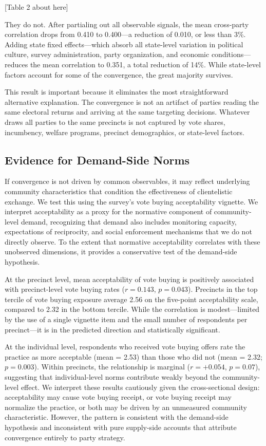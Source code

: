\documentclass[12pt,letterpaper]{article}
\begin{document}
[Table 2 about here]

They do not. After partialing out all observable signals, the mean cross-party correlation drops from 0.410 to 0.400---a reduction of 0.010, or less than 3\%. Adding state fixed effects---which absorb all state-level variation in political culture, survey administration, party organization, and economic conditions---reduces the mean correlation to 0.351, a total reduction of 14\%. While state-level factors account for some of the convergence, the great majority survives.

This result is important because it eliminates the most straightforward alternative explanation. The convergence is not an artifact of parties reading the same electoral returns and arriving at the same targeting decisions. Whatever draws all parties to the same precincts is not captured by vote shares, incumbency, welfare programs, precinct demographics, or state-level factors.


\subsection{Evidence for Demand-Side Norms}

If convergence is not driven by common observables, it may reflect underlying community characteristics that condition the effectiveness of clientelistic exchange. We test this using the survey's vote buying acceptability vignette. We interpret acceptability as a proxy for the normative component of community-level demand, recognizing that demand also includes monitoring capacity, expectations of reciprocity, and social enforcement mechanisms that we do not directly observe. To the extent that normative acceptability correlates with these unobserved dimensions, it provides a conservative test of the demand-side hypothesis.

At the precinct level, mean acceptability of vote buying is positively associated with precinct-level vote buying rates ($r = 0.143$, $p = 0.043$). Precincts in the top tercile of vote buying exposure average 2.56 on the five-point acceptability scale, compared to 2.32 in the bottom tercile. While the correlation is modest---limited by the use of a single vignette item and the small number of respondents per precinct---it is in the predicted direction and statistically significant.

At the individual level, respondents who received vote buying offers rate the practice as more acceptable (mean = 2.53) than those who did not (mean = 2.32; $p = 0.003$). Within precincts, the relationship is marginal ($r = +0.054$, $p = 0.07$), suggesting that individual-level norms contribute weakly beyond the community-level effect. We interpret these results cautiously given the cross-sectional design: acceptability may cause vote buying receipt, or vote buying receipt may normalize the practice, or both may be driven by an unmeasured community characteristic. However, the pattern is consistent with the demand-side hypothesis and inconsistent with pure supply-side accounts that attribute convergence entirely to party strategy.
\end{document}
